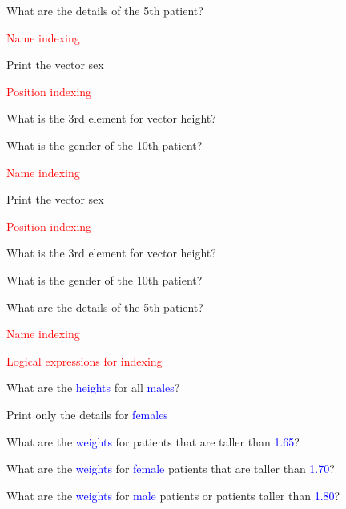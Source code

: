 \documentclass{presentatiesmetlogo}
\let \nl = \newline
\begin{document}
\item {}
\item What are the details of the 5th patient?
\nl
\eitemt
\item \textcolor{red}{Name indexing}
\bitemt
\item Print the vector sex
\eitemt
\eitem
\bitem
\item \textcolor{red}{Position indexing}
\bitemt
\item What is the 3rd element for vector height?
\item What is the gender of the 10th patient?
\item {}
\nl
\eitemt
\item \textcolor{red}{Name indexing}
\bitemt
\item Print the vector sex
\eitemt
\eitem
\bitem
\item \textcolor{red}{Position indexing}
\bitemt
\item What is the 3rd element for vector height?
\item What is the gender of the 10th patient?
\item What are the details of the 5th patient?
\nl
\eitemt
\item \textcolor{red}{Name indexing}
\bitemt
\item {}
\eitemt
\eitem
\bitem
\item \textcolor{red}{Logical expressions for indexing}
\bitemt
\item {}
\item What are the \textcolor{blue}{heights} for all \textcolor{blue}{males}?
\item Print only the details for \textcolor{blue}{females}
\item What are the \textcolor{blue}{weights} for patients that are taller than \textcolor{blue}{1.65}?
\item What are the \textcolor{blue}{weights} for \textcolor{blue}{female} patients that are taller than \textcolor{blue}{1.70}?
\item What are the \textcolor{blue}{weights} for \textcolor{blue}{male} patients or patients taller than \textcolor{blue}{1.80}?
\end{document}
